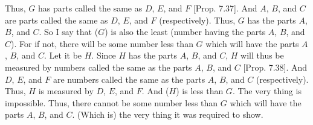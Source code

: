 \begin{Parallel}{}{}
{Thus, $G$ has parts called the same as $D$, $E$, and $F$ [Prop. 7.37]. And $A$, $B$, and $C$ are 
parts called the same as $D$, $E$, and $F$ (respectively). Thus, $G$ has the parts $A$, $B$, and $C$. So I say that ($G$) is also the least (number having the parts $A$, $B$, and $C$). For if not, there will be some number less than $G$ which will have the parts $A$, $B$, and $C$. Let it be
$H$. Since $H$ has the parts $A$, $B$, and $C$, $H$ will thus be measured
by numbers called the same as the parts $A$, $B$, and $C$  [Prop. 7.38]. And $D$, $E$, and $F$ are numbers called the same as the parts $A$, $B$, and $C$ (respectively). Thus, $H$ is measured by $D$, $E$, and $F$. And ($H$) is less than $G$. The
very thing is impossible. Thus, there cannot be some number less than $G$
which will have the parts $A$, $B$, and $C$. (Which is) the very thing it
was required to show.}
\end{Parallel}

\newpage
\thispagestyle{plain}
~\\
